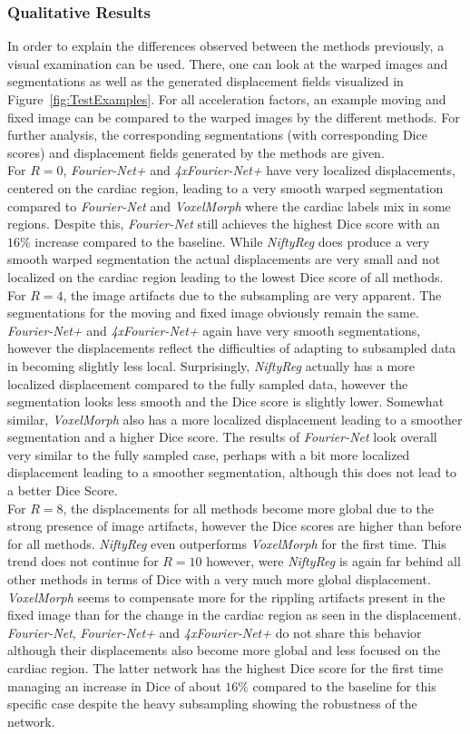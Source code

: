 \subsubsection{Qualitative Results}
In order to explain the differences observed between the methods previously, a visual examination can be used. There, one can look at the warped images and segmentations as well as the generated displacement fields visualized in Figure~\ref{fig:TestExamples}. For all acceleration factors, an example moving and fixed image can be compared to the warped images by the different methods. For further analysis, the corresponding segmentations (with corresponding Dice scores) and displacement fields generated by the methods are given.\\
For $R=0$, \emph{Fourier-Net+} and \emph{4xFourier-Net+} have very localized displacements, centered on the cardiac region, leading to a very smooth warped segmentation compared to \emph{Fourier-Net} and \emph{VoxelMorph} where the cardiac labels mix in some regions. Despite this, \emph{Fourier-Net} still achieves the highest Dice score with an $16\%$ increase compared to the baseline. While \emph{NiftyReg} does produce a very smooth warped segmentation the actual displacements are very small and not localized on the cardiac region leading to the lowest Dice score of all methods.\\
For $R=4$, the image artifacts due to the subsampling are very apparent. The segmentations for the moving and fixed image obviously remain the same.
\emph{Fourier-Net+} and \emph{4xFourier-Net+} again have very smooth segmentations, however the displacements reflect the difficulties of adapting to subsampled data in becoming slightly less local. Surprisingly, \emph{NiftyReg} actually has a more localized displacement compared to the fully sampled data, however the segmentation looks less smooth and the Dice score is slightly lower. Somewhat similar, \emph{VoxelMorph} also has a more localized displacement leading to a smoother segmentation and a higher Dice score. The results of \emph{Fourier-Net} look overall very similar to the fully sampled case, perhaps with a bit more localized displacement leading to a smoother segmentation, although this does not lead to a better Dice Score.\\
For $R=8$, the displacements for all methods become more global due to the strong presence of image artifacts, however the Dice scores are higher than before for all methods. \emph{NiftyReg} even outperforms \emph{VoxelMorph} for the first time. This trend does not continue for $R=10$ however, were \emph{NiftyReg} is again far behind all other methods in terms of Dice with a very much more global displacement. \emph{VoxelMorph} seems to compensate more for the rippling artifacts present in the fixed image than for the change in the cardiac region as seen in the displacement. \emph{Fourier-Net}, \emph{Fourier-Net+} and \emph{4xFourier-Net+} do not share this behavior although their displacements also become more global and less focused on the cardiac region. The latter network has the highest Dice score for the first time managing an increase in Dice of about $16\%$ compared to the baseline for this specific case despite the heavy subsampling showing the robustness of the network.
